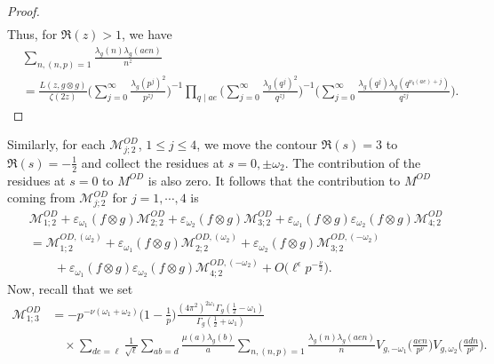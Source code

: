 \documentclass[12pt]{amsart}
\theoremstyle{plain}
\theoremstyle{definition}
\newcommand{\ve}{\varepsilon}
\begin{document}
\begin{proof}
\begin{align*}
    \end{align*}
Thus, for $\Re(z) >1$, we have
    \begin{align*}
       & \sum_{n, (n, p)=1}  \frac{\lambda_g(n)  \lambda_g(aen)}{n^{z}}
       \\
        & = 
        \frac{L(z, g\otimes g)}{\zeta(2z) } \Big( \sum_{j=0}^\infty
    \frac{\lambda_g(p^j)^2}{p^{zj}}
    \Big)^{-1}
        \prod_{q\mid ae} 
         \Big( \sum_{j=0}^\infty
    \frac{\lambda_g(q^j)^2}{q^{zj}}
    \Big)^{-1}
     \Big( \sum_{j=0}^\infty
    \frac{\lambda_g(q^j) \lambda_g(q^{\nu_{q}(ae)+j})}{q^{zj}}
    \Big).
    \end{align*}
\end{proof}
   

 
Similarly, for each $\mathscr{M}^{OD}_{j;2}$, $1\leq j \leq 4$, we move the contour $\Re(s)=3$ to $\Re(s)=-\frac12$ and collect the residues at $s=0, \pm \omega_2$. The  contribution of the residues at $s=0$ to  $M^{OD}$ is also zero. It follows that the contribution to $M^{OD}$ coming from $\mathscr{M}_{j;2}^{OD}$ for $j=1,\cdots,4$ is
\begin{equation}\label{eqn:fancyMOD12}
\begin{split}
&\mathscr{M}_{1;2}^{OD}
     +\ve_{\omega_1}(f\otimes g)\mathscr{M}_{2;2}^{OD}
  +\ve_{\omega_2}(f\otimes g)\mathscr{M}_{3;2}^{OD}
      +\ve_{\omega_1}(f\otimes g)\ve_{\omega_2}(f\otimes g) \mathscr{M}_{4;2}^{OD}\\
      &= \mathscr{M}_{1;2}^{OD,(\omega_2)}
     +\ve_{\omega_1}(f\otimes g)\mathscr{M}_{2;2}^{OD,(\omega_2)}
  +\ve_{\omega_2}(f\otimes g)\mathscr{M}_{3;2}^{OD,(-\omega_2)}
  \\
      &\qquad+\ve_{\omega_1}(f\otimes g)\ve_{\omega_2}(f\otimes g) \mathscr{M}_{4;2}^{OD,(-\omega_2)}
      +O\big(\ell^{\epsilon}p^{-\frac{\nu}{2}}\big).
\end{split}
\end{equation}
Now, recall that we set 
   \begin{align}\label{eqn:MOD13}
    \mathscr{M}^{OD}_{1;3}
    &=   -  p^{-\nu(\omega_1+\omega_2)}  \Big(1-\frac1{p}\Big)
    \frac{(4\pi^2)^{2\omega_1} \Gamma_g(\frac12-\omega_1)}{ \Gamma_g(\frac12+\omega_1) }\nonumber
    \\
     &\quad \times   \sum_{de=\ell}
        \frac{1}{\sqrt{\ell}}
        \sum_{ab=d} \frac{\mu(a)  \lambda_g(b)}{a}
        \sum_{n, (n,p)=1}  \frac{\lambda_g(n)  \lambda_g(aen)}{n }
     V_{g, -\omega_1}\Big(\frac{aen}{p^\nu}\Big)  V_{g, \omega_2} \Big(\frac{adn}{p^\nu }\Big)  .
    \end{align}
\end{document}
